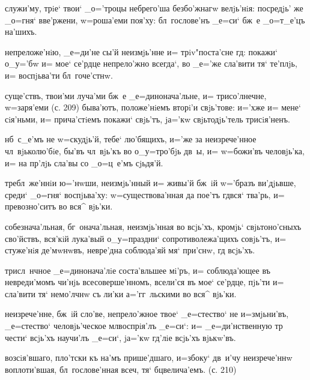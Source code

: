 служи'му, трiе` твои` _о='троцы небрего'ша безбо'жнагw 
велjь'нiя: посредjь' же _о=гня` вве'ржени, w=роша'еми 
поя'ху: бл~гослове'нъ _е=си` бж~е _о=т_е'цъ на'шихъ.

непреложе'нiю, _е=ди'не сы'й неизмjь'нне и= 
трiv"поста'сне гд: покажи` о_у='бw и= мое` се'рдце 
непрело'жно всегда`, во _е='же сла'вити тя` те'плjь, и= 
воспjьва'ти бл~гоче'стнw. %

суще'ствъ, твои'ми луча'ми бж~е _е=динонача'льне, и= 
трисо'лнечне, w=заря'еми (с. 209) быва'ютъ, положе'нiемъ 
вторi'и свjь'тове: и='хже и= мене` сiя'ньми, и= 
прича'стiемъ покажи` свjь'тъ, jа='кw свjьтодjь'тель 
трисiя'ненъ.

нб~с_е'мъ не w=скудjь'й, тебе` лю'бящихъ, и='же за 
неизрече'нное чл~вjьколю'бiе, бы'въ чл~вjь'къ во 
о_у=тро'бjь дв~ы, и= w=божи'въ человjь'ка, и= на 
пр'лjь сла'вы со _о=ц~е'мъ сjьдя'й.


требл~же'ннiи ю='нwши, неизмjь'нный и= живы'й бж~iй 
w='бразъ ви'дjьвше, среди` _о=гня` воспjьва'ху: 
w=существова'нная да пое'тъ гд вся` тва'рь, и= 
превозно'ситъ во вся^ вjь'ки.

собезнача'льная, бг~онача'льная, неизмjь'нная во всjь'хъ, 
кромjь` свjьтоно'сныхъ сво'йствъ, вся'кiй лука'вый 
о_у=праздни` сопротиволежа'щихъ совjь'тъ, и= стуже'нiя 
де'мwнwвъ, невре'дна соблюда'яй мя` при'снw, гд 
всjь'хъ. %

трисл~нчное _е=динонача'лiе соста'вльшее мi'ръ, и= 
соблюда'ющее въ невреди'момъ чи'нjь всесоверше'нномъ, 
всели'ся въ мое` се'рдце, пjь'ти и= сла'вити тя` 
немо'лчнw съ ли'ки а='гг~льскими во вся^ вjь'ки.

неизрече'нне, бж~iй сло'ве, непрело'жное твое` 
_е=стество` не и=змjьни'въ, _е=стество` человjь'ческое 
мл воспрiя'лъ _е=си`: и= _е=ди'нственную тр 
чести` всjь'хъ научи'лъ _е=си`, jа='кw гд'лiе 
всjь'хъ вjькw'въ.


возсiя'вшаго, пло'тски къ на'мъ прише'дшаго, и=з\ъ боку` 
дв~и'чу неизрече'ннw воплоти'вшая, бл~гослове'нная 
всеч, тя` бц велича'емъ. (с. 210)

